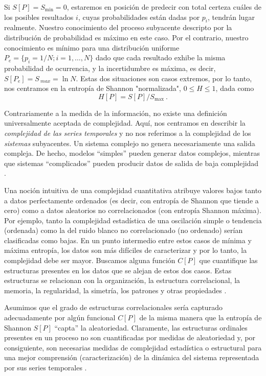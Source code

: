 Si $S[P] = S_{\min} = 0$, estaremos en posición de predecir con total certeza cuáles de los posibles resultados $i$, cuyas probabilidades están dadas por $p_i$, tendrán lugar realmente.
Nuestro conocimiento del proceso subyacente descripto por la distribución de probabilidad es máximo en este caso.
Por el contrario, nuestro conocimiento es mínimo para una distribución uniforme $P_e = \{p_i = 1/N; i = 1, \ldots, N \}$ dado que cada resultado exhibe la misma probabilidad de ocurrencia, y la incertidumbre es máxima, es decir, $S[P_e] = S_{\ max} = \ln N$.
Estas dos situaciones son casos extremos, por lo tanto, nos centramos en la entropía de Shannon "normalizada", $0 \leq H \leq 1$, dada como
\begin{equation}
\label{shannon-disc-normalizada}
H[P] = S[P] / S_{\max} \ .
\end{equation}

Contrariamente a la medida de la información, no existe una definición universalmente aceptada de complejidad.
Aquí, nos centramos en describir la \textit{complejidad de las series temporales} y no nos referimos a la complejidad de los \textit{sistemas} subyacentes.
Un sistema complejo no genera necesariamente una salida compleja.
De hecho, modelos ``simples'' pueden generar datos complejos, mientras que sistemas ``complicados'' pueden producir datos de salida de baja complejidad \cite{Kantz1998}.

Una noción intuitiva de una complejidad cuantitativa atribuye valores bajos tanto a datos perfectamente ordenados (es decir, con entropía de Shannon que tiende a cero) como a datos aleatorios no correlacionados (con entropía Shannon máxima).
Por ejemplo, tanto la complejidad estadística de una oscilación simple o tendencia (ordenada) como la del ruido blanco no correlacionado (no ordenado) serían clasificadas como bajas.
En un punto intermedio entre estos casos de mínima y máxima entropía, los datos son más difíciles de caracterizar y por lo tanto, la complejidad debe ser mayor.
Buscamos alguna función $C[P]$ que cuantifique las estructuras presentes en los datos que se alejan de estos dos casos.
Estas estructuras se relacionan con la organización, la estructura correlacional, la memoria, la regularidad, la simetría, los patrones y otras propiedades \cite{Feldman2008}.

Asumimos que el grado de estructuras correlacionales sería capturado adecuadamente por algún funcional $C[P]$ de la misma manera que la entropía de Shannon $S[P]$ \cite{Shannon1948} ``capta'' la aleatoriedad.
Claramente, las estructuras ordinales presentes en un proceso no son cuantificadas por medidas de aleatoriedad y, por consiguiente, son necesarias medidas de complejidad estadística o estructural para una mejor comprensión (caracterización) de la dinámica del sistema representada por sus series temporales \cite{Feldman1998}.

